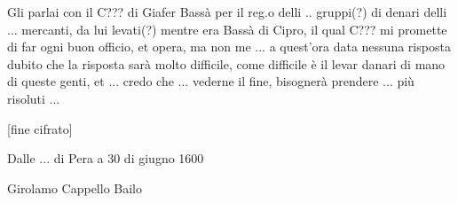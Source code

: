 Gli parlai con il C??? di Giafer Bassà per il reg.o delli .. gruppi(?)
di denari  delli ...  mercanti, da lui  levati(?) mentre era  Bassà di
Cipro, il qual C??? mi promette di far ogni buon officio, et opera, ma
non me  ... a quest'ora data  nessuna risposta dubito  che la risposta
sarà  molto difficile, come  difficile è  il levar  danari di  mano di
queste genti, et ... credo che ... vederne il fine, bisognerà prendere
... più risoluti ...

[fine cifrato]

Dalle ... di Pera a 30 di giugno 1600

\begin{raggedright}
Girolamo Cappello Bailo
\end{raggedright}

